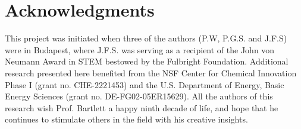 \documentclass[
12pt,
a4paper,
prb,
superscriptaddress,
tightenlines,  %
]{revtex4}
\begin{document}
\section{Acknowledgments} 

This project was initiated when three of the authors (P.W, P.G.S. and J.F.S)
were in Budapest, where J.F.S. was serving as a recipient of the John von
Neumann Award in STEM bestowed by the Fulbright Foundation. Additional
research presented here benefited from the NSF Center for Chemical Innovation
Phase I (grant no. CHE-2221453) and the U.S. Department of Energy, Basic Energy
Sciences (grant no. DE-FG02-05ER15629).  All the authors of this research wish
Prof. Bartlett a happy ninth decade of life, and hope that he continues to
stimulate others in the field with his creative insights.

\clearpage


\end{document}

